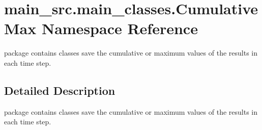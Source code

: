\hypertarget{namespacemain__src_1_1main__classes_1_1CumulativeMax}{\section{main\-\_\-src.\-main\-\_\-classes.\-Cumulative\-Max Namespace Reference}
\label{namespacemain__src_1_1main__classes_1_1CumulativeMax}
}


package contains classes save the cumulative or maximum values of the results in each time step.  




\subsection{Detailed Description}
package contains classes save the cumulative or maximum values of the results in each time step. 